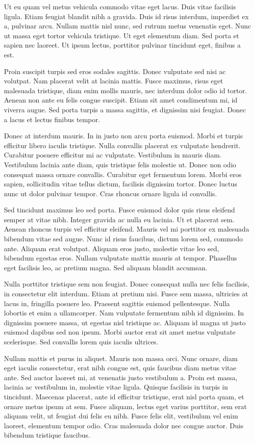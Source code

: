 Ut eu quam vel metus vehicula commodo vitae eget lacus. Duis vitae facilisis ligula. Etiam feugiat blandit nibh a gravida. Duis id risus interdum, imperdiet ex a, pulvinar arcu. Nullam mattis nisl nunc, sed rutrum metus venenatis eget. Nunc ut massa eget tortor vehicula tristique. Ut eget elementum diam. Sed porta et sapien nec laoreet. Ut ipsum lectus, porttitor pulvinar tincidunt eget, finibus a est.

Proin suscipit turpis sed eros sodales sagittis. Donec vulputate sed nisi ac volutpat. Nam placerat velit at lacinia mattis. Fusce maximus, risus eget malesuada tristique, diam enim mollis mauris, nec interdum dolor odio id tortor. Aenean non ante eu felis congue suscipit. Etiam sit amet condimentum mi, id viverra augue. Sed porta turpis a massa sagittis, et dignissim nisi feugiat. Donec a lacus et lectus finibus tempor.

Donec at interdum mauris. In in justo non arcu porta euismod. Morbi et turpis efficitur libero iaculis tristique. Nulla convallis placerat ex vulputate hendrerit. Curabitur posuere efficitur mi ac vulputate. Vestibulum in mauris diam. Vestibulum lacinia ante diam, quis tristique felis molestie ut. Donec non odio consequat massa ornare convallis. Curabitur eget fermentum lorem. Morbi eros sapien, sollicitudin vitae tellus dictum, facilisis dignissim tortor. Donec luctus nunc ut dolor pulvinar tempor. Cras rhoncus ornare ligula id convallis.

Sed tincidunt maximus leo sed porta. Fusce euismod dolor quis risus eleifend semper at vitae nibh. Integer gravida ac nulla eu lacinia. Ut et placerat sem. Aenean rhoncus turpis vel efficitur eleifend. Mauris vel mi porttitor ex malesuada bibendum vitae sed augue. Nunc id risus faucibus, dictum lorem sed, commodo ante. Aliquam erat volutpat. Aliquam eros justo, molestie vitae leo sed, bibendum egestas eros. Nullam vulputate mattis mauris at tempor. Phasellus eget facilisis leo, ac pretium magna. Sed aliquam blandit accumsan.

Nulla porttitor tristique sem non feugiat. Donec consequat nulla nec felis facilisis, in consectetur elit interdum. Etiam at pretium nisi. Fusce sem massa, ultricies at lacus in, fringilla posuere leo. Praesent sagittis euismod pellentesque. Nulla lobortis et enim a ullamcorper. Nam vulputate fermentum nibh id dignissim. In dignissim posuere massa, ut egestas nisl tristique ac. Aliquam id magna ut justo euismod dapibus sed non ipsum. Morbi auctor erat sit amet metus vulputate scelerisque. Sed convallis lorem quis iaculis ultrices.

Nullam mattis et purus in aliquet. Mauris non massa orci. Nunc ornare, diam eget iaculis consectetur, erat nibh congue est, quis faucibus diam metus vitae ante. Sed auctor laoreet mi, at venenatis justo vestibulum a. Proin est massa, lacinia ac vestibulum in, molestie vitae ligula. Quisque facilisis in turpis in tincidunt. Maecenas placerat, ante id efficitur tristique, erat nisl porta quam, et ornare metus ipsum at sem. Fusce aliquam, lectus eget varius porttitor, sem erat aliquam velit, ut feugiat dui felis eu nibh. Fusce felis elit, vestibulum vel enim laoreet, elementum tempor odio. Cras malesuada dolor nec congue auctor. Duis bibendum tristique faucibus.